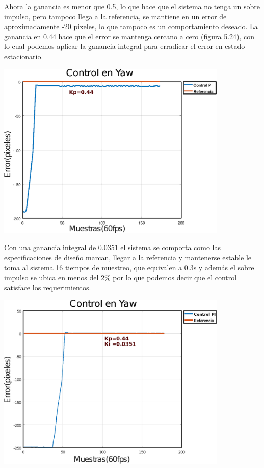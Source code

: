 Ahora la ganancia es menor que 0.5, lo que hace que el sistema no tenga un sobre impulso, pero tampoco llega
a la referencia, se mantiene en un error de aproximadamente -20 pixeles, lo que tampoco es un comportamiento deseado.
La ganancia en 0.44 hace que el error se mantenga cercano a cero (figura 5.24), con lo cual podemos aplicar la ganancia integral para erradicar el error en estado estacionario. 
\begin{center}
	\includegraphics[width=0.83\textwidth]{Contenido/Cuerpo/Capitulo5/Fig32.eps}
	\label{Fig4}
\end{center}
Con una ganancia integral de 0.0351 el sistema se comporta como las especificaciones de diseño marcan, llegar a la referencia y mantenerse estable le toma al sistema 16 tiempos de
muestreo, que equivalen a 0.3s y además el sobre impulso se ubica en menos del 2\% por lo que podemos decir que el control satisface los requerimientos.
\begin{center}
	\includegraphics[width=0.83\textwidth]{Contenido/Cuerpo/Capitulo5/Fig33.eps}
	\label{Fig4}
\end{center}